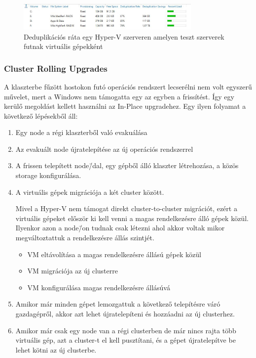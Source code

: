 \documentclass[12pt,oneside,justify,table]{book}
\begin{document}
\begin{figure}[ht]
\centering
\includegraphics[width=0.8\textwidth]{deduplication-ratio-sample}
\caption{Deduplikációs ráta egy Hyper-V szerveren amelyen teszt szerverek futnak virtuális gépekként}
\label{fig:deduplication_ratio}
\end{figure}

\subsubsection{Cluster Rolling Upgrades}

A klaszterbe fűzött hostokon futó operációs rendszert lecserélni nem volt egyszerű művelet, mert a Windows nem támogatta egy az egyben a frissítést. Így egy kerülő megoldást kellett használni az In-Place upgradehez. Egy ilyen folyamat a következő lépésekből áll:
\begin{enumerate}
	\item Egy node a régi klaszterből való evakuálása
	\item Az evakuált node újratelepítése az új operációs rendszerrel
	\item A frissen telepített node\=/dal, egy gépből álló klaszter létrehozása, a közös storage konfigurálása.
 	\item A virtuális gépek migrációja a két cluster között.

Mivel a Hyper-V nem támogat direkt cluster-to-cluster migrációt, ezért a virtuális gépeket először ki kell venni a magas rendelkezésre álló gépek közül. Ilyenkor azon a node\=/on tudnak csak létezni ahol akkor voltak mikor megváltoztattuk a rendelkezésre állás szintjét.
	\begin{itemize}
		
		\item VM eltávolítása a magas rendelkezésre állású gépek közül
		\item VM migrációja az új clusterre
		\item VM konfigurálása magas rendelkezésre állásúvá
	\end{itemize}
	\item Amikor már minden gépet lemozgattuk a következő telepítésre váró gazdagépről, akkor azt lehet újratelepíteni és hozzáadni az új clusterhez.
	\item Amikor már csak egy node van a régi clusterben de már nincs rajta több virtuális gép, azt a cluster-t el kell pusztítani, és a gépet újratelepítve be lehet kötni az új clusterbe.
\end{enumerate}
\end{document}
